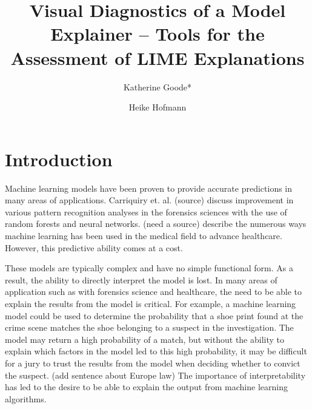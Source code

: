 \documentclass[AMS,STIX2COL]{WileyNJD-v2}
\begin{document}


\title{Visual Diagnostics of a Model Explainer -- Tools for the Assessment of LIME Explanations}

\author[1]{Katherine Goode*}

\author[1,2]{Heike Hofmann}


\address[1]{, , }

\address[2]{, , }






\maketitle

\section{Introduction}

Machine learning models have been proven to provide accurate predictions in many areas of applications. Carriquiry et. al. (source) discuss improvement in various pattern recognition analyses in the forensics sciences with the use of random forests and neural networks. (need a source) describe the numerous ways machine learning has been used in the medical field to advance healthcare. However, this predictive ability comes at a cost. 

These models are typically complex and have no simple functional form. As a result, the ability to directly interpret the model is lost. In many areas of application such as with forensics science and healthcare, the need to be able to explain the results from the model is critical. For example, a machine learning model could be used to determine the probability that a shoe print found at the crime scene matches the shoe belonging to a suspect in the investigation. The model may return a high probability of a match, but without the ability to explain which factors in the model led to this high probability, it may be difficult for a jury to trust the results from the model when deciding whether to convict the suspect. (add sentence about Europe law) The importance of interpretability has led to the desire to be able to explain the output from machine learning algorithms.
\end{document}
